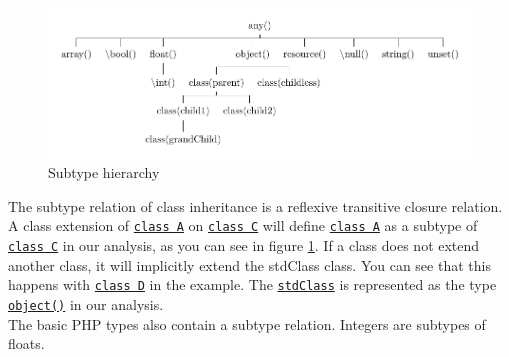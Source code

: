 \documentclass[../main.tex]{subfiles}
\begin{document}
    \begin{figure}[H]
        \includegraphics{Diagrams/Subtypes.pdf}
        \caption{Subtype hierarchy}
        \label{fig:subtypes}
    \end{figure}

    The subtype relation of class inheritance is a \gls{reflexive transitive closure} relation.
    A class extension of \underline{\texttt{class A}} on \underline{\texttt{class C}} will define \underline{\texttt{class A}} as a subtype of \underline{\texttt{class C}} in our analysis, as you can see in figure \ref{fig:subtypes}.
    If a class does not extend another class, it will implicitly extend the \gls{stdClass} class.
    You can see that this happens with \underline{\texttt{class D}} in the example.
    The \underline{\texttt{stdClass}} is represented as the type \underline{\texttt{object()}} in our analysis.
    \\
    The basic PHP types also contain a subtype relation.
    Integers are subtypes of floats.
 
\end{document}
